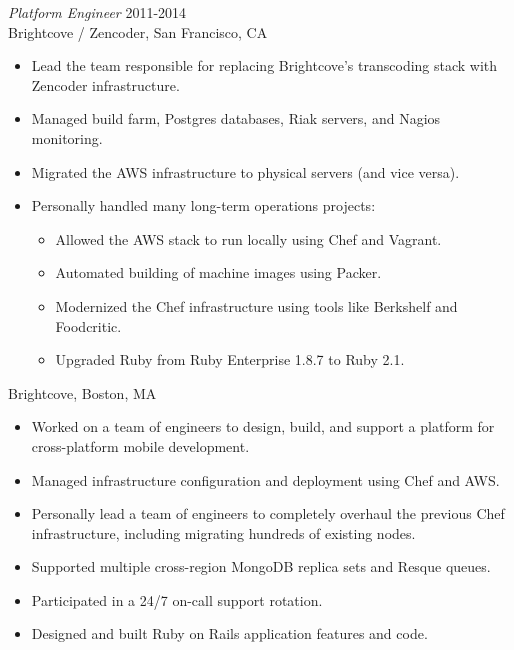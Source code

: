\documentclass[line,margin]{res}
\begin{document}
\begin{resume}
  {\sl Platform Engineer}  \hfill 2011-2014 \\
  Brightcove / Zencoder,
  San Francisco, CA
  \begin{itemize}  \itemsep -2pt %
    \item Lead the team responsible for replacing Brightcove's transcoding stack with Zencoder infrastructure.
    \item Managed build farm, Postgres databases, Riak servers, and Nagios monitoring.
    \item Migrated the AWS infrastructure to physical servers (and vice versa).
    \item Personally handled many long-term operations projects:

    \vspace{-2.5mm} %
    \begin{itemize}  \itemsep -3pt %
      \item Allowed the AWS stack to run locally using Chef and Vagrant.
      \item Automated building of machine images using Packer.
      \item Modernized the Chef infrastructure using tools like Berkshelf and Foodcritic.
      \item Upgraded Ruby from Ruby Enterprise 1.8.7 to Ruby 2.1.
    \end{itemize}
  \end{itemize}
  
  \vspace{-4mm} %
  Brightcove,
  Boston, MA
  \begin{itemize}  \itemsep -2pt %
    \item Worked on a team of engineers to design, build, and support a platform for cross-platform mobile development.
    \item Managed infrastructure configuration and deployment using Chef and AWS.
    \item Personally lead a team of engineers to completely overhaul the previous Chef infrastructure, including migrating hundreds of existing nodes.
    \item Supported multiple cross-region MongoDB replica sets and Resque queues.
    \item Participated in a 24/7 on-call support rotation.
    \item Designed and built Ruby on Rails application features and code.
  \end{itemize}


\end{resume}
\end{document}
